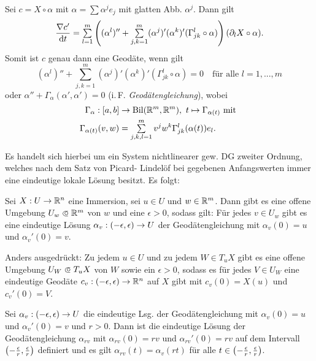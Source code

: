 \documentclass{cheat-sheet}
\newcommand{\Bil}{\mathrm{Bil}} %
\begin{document}
\begin{bem}
  Sei $c = X \circ \alpha$ mit $\alpha = \sum \alpha^j e_j$ mit glatten Abb. $\alpha^j$. Dann gilt
  \[ \frac{\nabla c'}{\d t} = \sum_{l=1}^m \left( (\alpha^l)'' + \sum_{j,k=1}^m (\alpha^j)' (\alpha^k)' (\Gamma_{jk}^l \circ \alpha) \right) (\partial_l X \circ \alpha). \]
  Somit ist $c$ genau dann eine Geodäte, wenn gilt
  \[ (\alpha^l)'' + \sum_{j,k=1}^m (\alpha^j)' (\alpha^k)' (\Gamma_{jk}^l \circ \alpha) = 0 \quad \text{für alle $l = 1, ..., m$} \]
  oder $\alpha'' + \Gamma_{\alpha}(\alpha', \alpha') = 0$ (i.\,F. \emph{Geodätengleichung}), wobei
  \begin{align*}
    \Gamma_{\alpha} : \cinterval{a}{b} &\to \Bil(\R^m, \R^m), \  t \mapsto \Gamma_{\alpha(t)} \text{ mit }\\
    \Gamma_{\alpha(t)}(v, w) &= \sum_{j,k,l=1}^m v^j w^k \Gamma_{jk}^l (\alpha(t)) e_l.
  \end{align*}
\end{bem}

\begin{bem}
  Es handelt sich hierbei um ein System nichtlinearer gew. DG zweiter Ordnung, welches nach dem Satz von Picard- Lindelöf bei gegebenen Anfangswerten immer eine eindeutige lokale Lösung besitzt. Es folgt:
\end{bem}

\begin{satz}
  Sei $X : U \to \mathbb{R}^n$ eine Immersion, sei $u \in U$ und $w \in \mathbb{R}^m$. Dann gibt es eine offene Umgebung $U_w \opn \R^m$ von $w$ und eine $\epsilon > 0$, sodass gilt: Für jedes $v \in U_w$ gibt es eine eindeutige Lösung $\alpha_v : \left( -\epsilon, \epsilon \right) \to U$ der Geodätengleichung mit $\alpha_v(0) = u$ und $\alpha_v'(0) = v$.

  Anders ausgedrückt: Zu jedem $u \in U$ und zu jedem $W \in T_u X$ gibt es eine offene Umgebung $U_W \opn T_u X$ von $W$ sowie ein $\epsilon > 0$, sodass es für jedes $V \in U_W$ eine eindeutige Geodäte $c_v : \left( -\epsilon, \epsilon \right) \to \mathbb{R}^n$ auf $X$ gibt mit $c_v(0) = X(u)$ und $c_v'(0) = V$.
\end{satz}

\begin{satz}
  Sei $\alpha_v : \left( -\epsilon, \epsilon \right) \to U$ die eindeutige Lsg. der Geodätengleichung mit $\alpha_v(0) = u$ und $\alpha_v'(0) = v$ und $r > 0$. Dann ist die eindeutige Lösung der Geodätengleichung $\alpha_{rv}$ mit $\alpha_{rv}(0) = rv$ und $\alpha_{rv}'(0) = rv$ auf dem Intervall $\left( -\tfrac{\epsilon}{r}, \tfrac{\epsilon}{r} \right)$ definiert und es gilt
  $\alpha_{rv}(t) = \alpha_v(rt)$ für alle $t \in \left( -\tfrac{\epsilon}{r}, \tfrac{\epsilon}{r} \right)$.
\end{satz}
\end{document}
